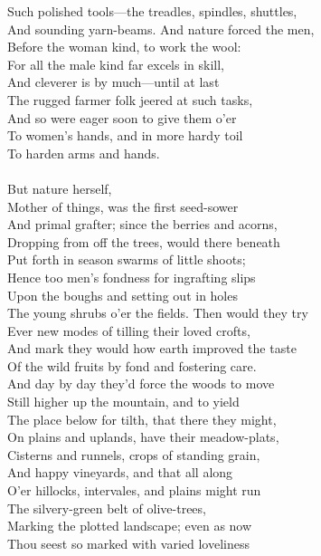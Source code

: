 Such polished tools—the treadles, spindles, shuttles,\\
And sounding yarn-beams. And nature forced the men,\\
Before the woman kind, to work the wool:\\
For all the male kind far excels in skill,\\
And cleverer is by much—until at last\\
The rugged farmer folk jeered at such tasks,\\
And so were eager soon to give them o'er\\
To women's hands, and in more hardy toil\\
To harden arms and hands.\\
\\
But nature herself,\\
Mother of things, was the first seed-sower\\
And primal grafter; since the berries and acorns,\\
Dropping from off the trees, would there beneath\\
Put forth in season swarms of little shoots;\\
Hence too men's fondness for ingrafting slips\\
Upon the boughs and setting out in holes\\
The young shrubs o'er the fields. Then would they try\\
Ever new modes of tilling their loved crofts,\\
And mark they would how earth improved the taste\\
Of the wild fruits by fond and fostering care.\\
And day by day they'd force the woods to move\\
Still higher up the mountain, and to yield\\
The place below for tilth, that there they might,\\
On plains and uplands, have their meadow-plats,\\
Cisterns and runnels, crops of standing grain,\\
And happy vineyards, and that all along\\
O'er hillocks, intervales, and plains might run\\
The silvery-green belt of olive-trees,\\
Marking the plotted landscape; even as now\\
Thou seest so marked with varied loveliness\\
